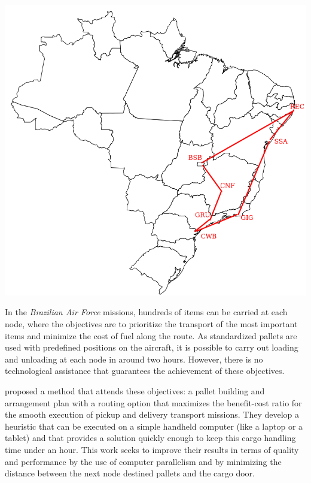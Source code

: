\documentclass[preprint,authoryear]{elsarticle}
\begin{document}
\begin{table}[H]
\begin{minipage}{0.45\linewidth}
	\end{minipage}\hfill %
	\begin{minipage}{0.50\linewidth}
		\centering
		\includegraphics[scale=0.25]{Images/nodes.png}
		\label{fig:nodes}		
	\end{minipage}
\end{table}


In the {\it Brazilian Air Force}\/ missions, hundreds of items can be carried at each node, where the objectives are to prioritize the transport of the most important items and minimize the cost of fuel along the route. As standardized pallets are used with predefined positions on the aircraft, it is possible to carry out loading and unloading at each node in around two hours. However, there is no technological assistance that guarantees the achievement of these objectives.

\cite{MesquitaSanches2023} proposed a method that attends these objectives: a pallet building and arrangement plan with a routing option that maximizes the benefit-cost ratio for the smooth execution of pickup and delivery transport missions. They develop a heuristic that can be executed on a simple handheld computer (like a laptop or a tablet) and that provides a solution quickly enough to keep this cargo handling time under an hour. This work seeks to improve their results in terms of quality and performance by the use of computer parallelism and by minimizing the distance between the next node destined pallets and the cargo door.
\end{document}
